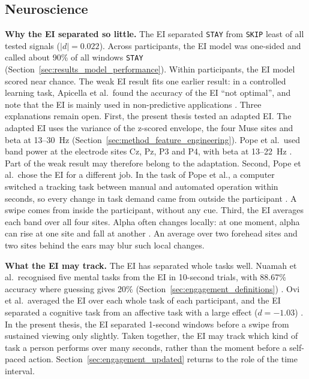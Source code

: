 \documentclass[12pt,a4paper]{report}
\begin{document}
\subsection{Neuroscience}

\textbf{Why the EI separated so little.} The EI separated \texttt{STAY} from \texttt{SKIP} least of all tested signals (\(|d| = 0.022\)). Across participants, the EI model was one-sided and called about 90\% of all windows \texttt{STAY} (Section~\ref{sec:results_model_performance}). Within participants, the EI model scored near chance. The weak EI result fits one earlier result: in a controlled learning task, Apicella et al.\ found the accuracy of the EI ``not optimal'', and note that the EI is mainly used in non-predictive applications \cite{apicella_eeg-based_2022}. Three explanations remain open. First, the present thesis tested an adapted EI. The adapted EI uses the variance of the z-scored envelope, the four Muse sites and beta at 13--30~Hz (Section~\ref{sec:method_feature_engineering}). Pope et al.\ used band power at the electrode sites Cz, Pz, P3 and P4, with beta at 13--22~Hz \cite{pope_biocybernetic_1995-3}. Part of the weak result may therefore belong to the adaptation. Second, Pope et al.\ chose the EI for a different job. In the task of Pope et al., a computer switched a tracking task between manual and automated operation within seconds, so every change in task demand came from outside the participant \cite{pope_biocybernetic_1995-3}. A swipe comes from inside the participant, without any cue. Third, the EI averages each band over all four sites. Alpha often changes locally: at one moment, alpha can rise at one site and fall at another \cite{pfurtscheller_event-related_1996}. An average over two forehead sites and two sites behind the ears may blur such local changes.

\textbf{What the EI may track.} The EI has separated whole tasks well. Nuamah et al.\ recognised five mental tasks from the EI in 10-second trials, with 88.67\% accuracy where guessing gives 20\% (Section~\ref{sec:engagement_definitions}) \cite{nuamah_electroencephalography_2017}. Ovi et al.\ averaged the EI over each whole task of each participant, and the EI separated a cognitive task from an affective task with a large effect (\(d = -1.03\)) \cite{ovi_frequency_2026}. In the present thesis, the EI separated 1-second windows before a swipe from sustained viewing only slightly. Taken together, the EI may track which kind of task a person performs over many seconds, rather than the moment before a self-paced action. Section~\ref{sec:engagement_updated} returns to the role of the time interval.
\end{document}
